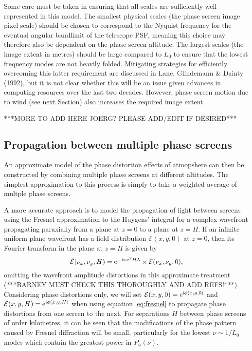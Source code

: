 \documentclass[preprint]{aastex}
\begin{document}
Some care must be taken in ensuring that
all scales are sufficiently well-represented in this model. The
smallest physical scales (the phase screen image pixel scale) should be chosen to
correspond to the Nyquist frequency for the eventual
angular bandlimit of the telescope PSF, meaning this choice may
therefore also be dependent on the phase screen altitude.
The largest scales (the image extent in metres) should be large
compared to $L_0$ to ensure that the lowest frequency modes are not
heavily folded.  Mitigating strategies for efficiently overcoming this
latter requirement are discussed in Lane, Glindemann \& Dainty (1992),
but it is not clear whether this will be an issue given advances in
computing resources over the last two decades.  However, phase screen
motion due to wind (see next Section) also increases the required
image extent.

***MORE TO ADD HERE JOERG? PLEASE ADD/EDIT IF DESIRED***

\subsection{Propagation between multiple phase screens}
An approximate model of the phase distortion effects of atmopshere can
then be constructed by combining multiple phase screens at different
altitudes.  The simplest approximation to this process is simply to
take a weighted average of multple phase screens.

A more accurate approach is to model the propagation of light between
screens using the Fresnel approximation to the Huygens' integral for a
complex wavefront propagating paraxially from a plane at $z=0$ to a
plane at $z=H$.  If an infinite uniform plane wavefront has a field
distribution $\mathcal{E}(x, y, 0)$ at $z=0$, then its Fourier
transform in the plane at $z=H$ is given by
\begin{equation}\label{eq:fresnel}
\tilde{\mathcal{E}}(\nu_x, \nu_y, H) = {\rm e}^{-{\rm i} \pi \nu^2  H
  \lambda} \times \tilde{\mathcal{E}}(\nu_x, \nu_y, 0),
\end{equation}
omitting the wavefront amplitude distortions in this approximate treatment (***BARNEY MUST CHECK THIS
THOROUGHLY AND ADD REFS!***).   Considering phase distortions only, we will
set $\mathcal{E}(x, y, 0) = {\rm e}^{{\rm i}\phi(x, y, 0)}$ and
$\mathcal{E}(x, y, H) = {\rm e}^{{\rm i}\phi(x, y, H)}$ when using
equation \eqref{eq:fresnel} to propagate phase distortions from one
screen to the next.
For separations $H$ between phase screens
of order kilometres, it can be seen that the modifications of the phase pattern
caused by Fresnel diffraction will be small, particularly for the
lowest $\nu \sim 1/L_0$ modes which contain the greatest power in $P_{\phi}(\nu)$.
\end{document}
